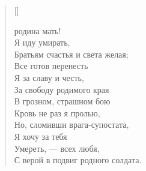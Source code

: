 \newpage
\vspace*{0cm}


\settowidth{\versewidth}{За свободу родимого края\ldotst}
\begin{verse}[\versewidth]
\begin{patverse*}
 родина мать!\\
    Я иду умирать,\\
Братьям счастья и света желая;\\
    Все готов перенесть\\
    Я за славу и честь,\\
За свободу родимого края\ldotst\\
    В грозном, страшном бою\\
    Кровь не раз я пролью,\\
Но, сломивши врага-супостата,\\
    Я хочу за тебя\\
    Умереть, --- всех любя,\\
С верой в подвиг родного солдата.
\end{patverse*}
\end{verse}

\newpage
\vspace*{0cm}


